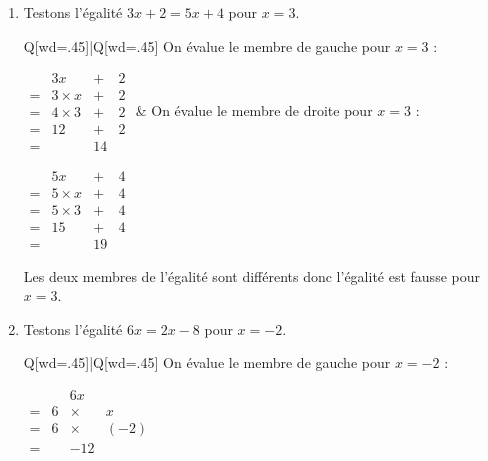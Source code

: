 \documentclass{thecours}
\begin{document}
            \begin{enumerate}
                \item Testons l'égalité $3x+2=5x+4$ pour $x=3$.
                \vskip 10pt
                \begin{tblr}{Q[wd=.45\linewidth]|Q[wd=.45\linewidth]}
                    On évalue le membre de gauche pour $x=3$ :
                    \par\vskip 10pt\hskip 30pt
                    $\begin{array}{cccc}
                        &3x&+&2\\
                        =&3\times x&+&2\\
                        =&4\times 3&+&2\\
                        =&12&+&2\\
                        =&&14&
                    \end{array}$
                    &
                    On évalue le membre de droite pour $x=3$ :
                    \par\vskip 10pt\hskip 30pt
                    $\begin{array}{cccc}
                        &5x&+&4\\
                        =&5\times x&+&4\\
                        =&5\times 3&+&4\\
                        =&15&+&4\\
                        =&&19&
                    \end{array}$
                \end{tblr}\vskip 10pt%
                Les deux membres de l'égalité sont différents donc l'égalité
                est fausse pour $x=3$.
                \item Testons l'égalité $6x=2x-8$ pour $x=-2$.
                \vskip 10pt
                \begin{tblr}{Q[wd=.45\linewidth]|Q[wd=.45\linewidth]}
                    On évalue le membre de gauche pour $x=-2$ :
                    \par\vskip 10pt\hskip 30pt
                    $\begin{array}{cccc}
                        &&6x&\\
                        =&6&\times&x\\
                        =&6&\times&(-2)\\
                        =&&-12&
                    \end{array}$

\end{tblr}
\end{enumerate}
\end{document}
